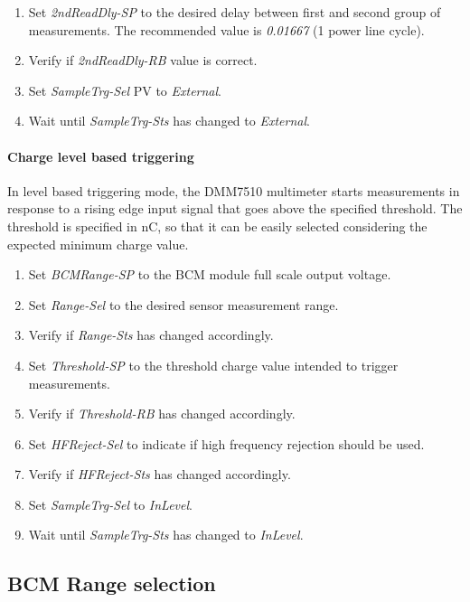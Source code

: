 \documentclass[openany]{article}
\begin{document}
			\begin{enumerate}
				\item Set \emph{2ndReadDly-SP} to the desired delay between first and second group of measurements. The recommended value is \emph{0.01667} (1 power line cycle).
				\item Verify if \emph{2ndReadDly-RB} value is correct.
				\item Set \emph{SampleTrg-Sel} PV to \emph{External}.
				\item Wait until \emph{SampleTrg-Sts} has changed to \emph{External}.
			\end{enumerate}

		\paragraph{Charge level based triggering} In level based triggering mode, the DMM7510 multimeter starts measurements in response to a rising edge input signal that goes above the specified threshold. The threshold is specified in nC, so that it can be easily selected considering the expected minimum charge value.

			\begin{enumerate}
				\item Set \emph{BCMRange-SP} to the BCM module full scale output voltage.
				\item Set \emph{Range-Sel} to the desired sensor measurement range.
				\item Verify if \emph{Range-Sts} has changed accordingly.
				\item Set \emph{Threshold-SP} to the threshold charge value intended to trigger measurements.
				\item Verify if \emph{Threshold-RB} has changed accordingly.
				\item Set \emph{HFReject-Sel} to indicate if high frequency rejection should be used.
				\item Verify if \emph{HFReject-Sts} has changed accordingly.
				\item Set \emph{SampleTrg-Sel} to \emph{InLevel}.
				\item Wait until \emph{SampleTrg-Sts} has changed to \emph{InLevel}.
			\end{enumerate}

	\subsection{BCM Range selection}
\end{document}
